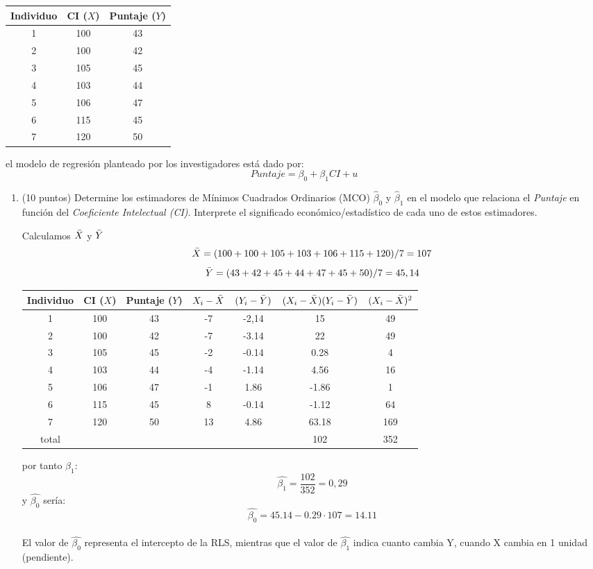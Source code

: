 \documentclass[10pt,a4paper]{article}
\begin{document}
\begin{enumerate}
\begin{center}
\begin{tabular}{|c|c|c|}
\hline
\textbf{Individuo} & \textbf{CI} ($X$) & \textbf{Puntaje} ($Y$)\\
\hline
1 & 100  & 43 \\
2 & 100 & 42 \\
3 & 105 & 45 \\
4 & 103 & 44 \\
5 & 106 & 47 \\
6 & 115 & 45 \\
7 & 120 & 50 \\
\hline
\end{tabular}
\end{center}

el modelo de regresión planteado por los investigadores está dado por:
$$Puntaje = \beta_0 + \beta_1 CI + u$$

\begin{enumerate}
      \item (10 puntos) Determine los estimadores de Mínimos Cuadrados Ordinarios (MCO) 
$\hat{\beta}_0$ y $\hat{\beta}_1$ en el modelo que relaciona el 
\textit{Puntaje} en función del \textit{Coeficiente Intelectual (CI)}. 
Interprete el significado económico/estadístico de cada uno de estos estimadores.



{\color{blue} Calculamos $\Bar{X}$ y $\Bar{Y}$
$$\Bar{X} = (100+100+105+103+106+115+120)/7=107$$
$$\Bar{Y}=(43+42+45+44+47+45+50)/7=45,14$$
\begin{center}
\begin{tabular}{|c|c|c|c|c|c|c|}
\hline
\textbf{Individuo} & \textbf{CI} ($X$) & \textbf{Puntaje} ($Y$) & $X_i-\Bar{X}$ & $(Y_i - \Bar{Y})$ & $(X_i-\Bar{X})(Y_i-\Bar{Y})$ & $(X_i-\Bar{X})^2$\\
\hline
1 & 100  & 43 & -7 & -2,14  & 15    & 49\\
2 & 100 & 42 &  -7 & -3.14 & 22    &   49 \\
3 & 105 & 45 & -2  & -0.14   & 0.28  & 4  \\
4 & 103 & 44 & -4  & -1.14   & 4.56     & 16 \\
5 & 106 & 47 & -1  & 1.86   & -1.86    & 1  \\
6 & 115 & 45 &  8  & -0.14 & -1.12    & 64 \\
7 & 120 & 50 & 13  & 4.86    & 63.18    & 169 \\
\hline
total & & & & & 102 & 352 
\end{tabular}
\end{center}
por tanto $\beta_1$:
$$\hat{\beta_1} = \frac{102}{352}=0,29$$
y $\hat{\beta_0}$ sería:
$$\hat{\beta_0}= 45.14-0.29\cdot 107 = 14.11$$
\\ 
    El valor de $\hat{\beta_0}$ representa el intercepto de la RLS, mientras que el valor de $\hat{\beta_1}$ indica cuanto cambia Y, cuando X cambia en 1 unidad (pendiente).}


\end{enumerate}
\end{enumerate}
\end{document}
